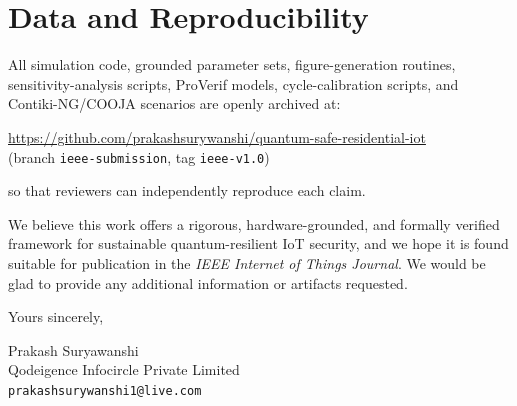 \documentclass[11pt]{article}
\begin{document}
\section*{Data and Reproducibility}
All simulation code, grounded parameter sets, figure-generation routines,
sensitivity-analysis scripts, ProVerif models, cycle-calibration scripts, and
Contiki-NG/COOJA scenarios are openly archived at:
\begin{center}
\url{https://github.com/prakashsurywanshi/quantum-safe-residential-iot}\\
(branch \texttt{ieee-submission}, tag \texttt{ieee-v1.0})
\end{center}
so that reviewers can independently reproduce each claim.

We believe this work offers a rigorous, hardware-grounded, and formally verified
framework for sustainable quantum-resilient IoT security, and we hope it is found
suitable for publication in the \emph{IEEE Internet of Things Journal}. We would be
glad to provide any additional information or artifacts requested.

\vspace{0.5em}
Yours sincerely,

\vspace{1.2em}
Prakash Suryawanshi\\
Qodeigence Infocircle Private Limited\\
\texttt{prakashsurywanshi1@live.com}
\end{document}
